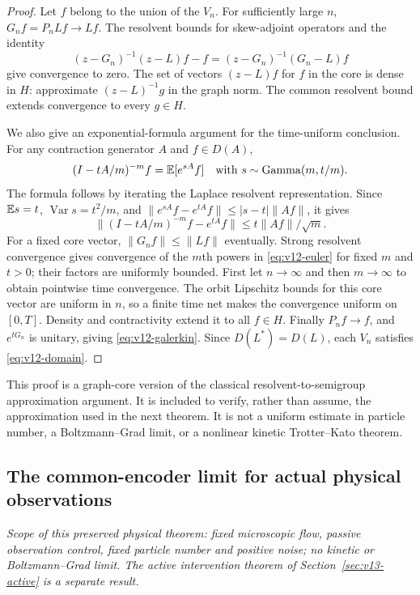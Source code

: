 \begin{proof}
Let $f$ belong to the union of the $V_n$. For sufficiently large $n$,
$G_nf=P_nLf\to Lf$. The resolvent bounds for skew-adjoint operators and
the identity
\[
 (z-G_n)^{-1}(z-L)f-f
       =(z-G_n)^{-1}(G_n-L)f
\]
give convergence to zero. The set of vectors $(z-L)f$ for $f$ in the
core is dense in $H$: approximate $(z-L)^{-1}g$ in the graph norm.
The common resolvent bound extends convergence to every $g\in H$.

We also give an exponential-formula argument for the time-uniform
conclusion. For any contraction generator $A$ and $f\in D(A)$,
\[
 (I-tA/m)^{-m}f=\mathbb E[e^{sA}f]\quad
 \text{with }s\sim\operatorname{Gamma}(m,t/m).
\]
The formula follows by iterating the Laplace resolvent representation.
Since $\mathbb E s=t$, $\operatorname{Var}s=t^2/m$, and
$\|e^{sA}f-e^{tA}f\|\le |s-t|\|Af\|$, it gives
\begin{equation}
 \|(I-tA/m)^{-m}f-e^{tA}f\|
       \le t\|Af\|/\sqrt m.
 \label{eq:v12-euler}
\end{equation}
For a fixed core vector, $\|G_nf\|\le\|Lf\|$ eventually.
Strong resolvent convergence gives convergence of the $m$th powers in
\eqref{eq:v12-euler} for fixed $m$ and $t>0$; their factors are uniformly
bounded. First let $n\to\infty$ and then $m\to\infty$ to obtain pointwise
time convergence. The orbit Lipschitz bounds for this core vector are
uniform in $n$, so a finite time net makes the convergence uniform on
$[0,T]$. Density and contractivity extend it to all $f\in H$.
Finally $P_nf\to f$, and $e^{tG_n}$ is unitary, giving
\eqref{eq:v12-galerkin}. Since $D(L^*)=D(L)$, each $V_n$ satisfies
\eqref{eq:v12-domain}.
\end{proof}

This proof is a graph-core version of the classical resolvent-to-semigroup
approximation argument. It is included to verify, rather than assume,
the approximation used in the next theorem. It is not a uniform estimate
in particle number, a Boltzmann--Grad limit, or a nonlinear kinetic
Trotter--Kato theorem.

\subsection{The common-encoder limit for actual physical observations}

\emph{Scope of this preserved physical theorem: fixed microscopic flow,
passive observation control, fixed particle number and positive noise;
no kinetic or Boltzmann--Grad limit. The active intervention theorem of
Section~\ref{sec:v13-active} is a separate result.}

